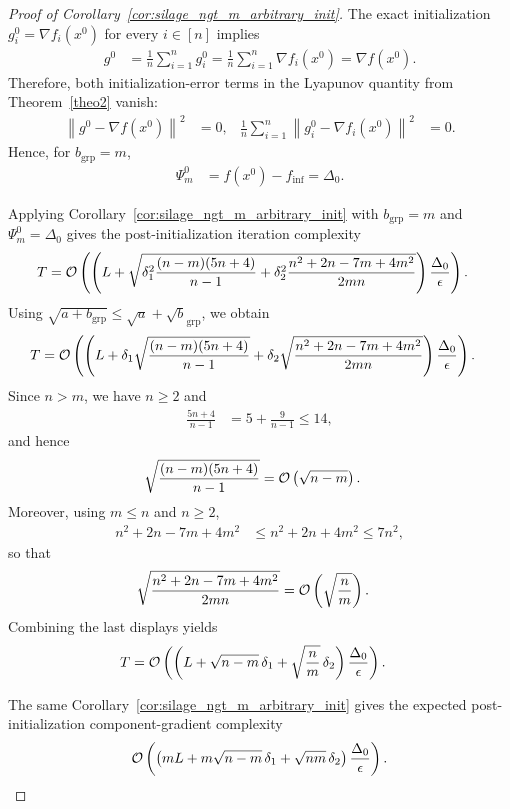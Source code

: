 \documentclass{article}
\newcommand{\sqn}[1]{\left\| #1 \right\|^2}
\newcommand{\nf}[1]{\nabla f\rb{#1}}
\newcommand{\cO}{{\cal O}}
\newcommand{\finf}{f_\mathrm{inf}}
\newcommand{\rb}[1]{\left(#1\right)}
\newcommand {\rbl}[1]{(#1)} %
\renewcommand{\nf}[1]{\nabla f\rbl{#1}}
\newcommand{\nfi}[1]{\nabla f_i\rbl{#1}}
\theoremstyle{plain}
\begin{document}
\begin{proof}[Proof of Corollary~\ref{cor:silage_ngt_m_arbitrary_init}]
The exact initialization $g_i^0=\nfi{x^0}$ for every $i\in[n]$ implies
\begin{align*}
g^0
&=
\frac1n\sum_{i=1}^n g_i^0
=
\frac1n\sum_{i=1}^n \nfi{x^0}
=
\nf{x^0}.
\end{align*}
Therefore, both initialization-error terms in the Lyapunov quantity from Theorem~\ref{theo2} vanish:
\begin{align*}
\sqn{g^0-\nf{x^0}}
&=0,
&
\frac1n\sum_{i=1}^n\sqn{g_i^0-\nfi{x^0}}
&=0.
\end{align*}
Hence, for $b_{\mathrm{grp}}=m$,
\begin{align*}
\Psi_m^0
&=
f(x^0)-\finf
=
\Delta_0.
\end{align*}

Applying Corollary~\ref{cor:silage_ngt_m_arbitrary_init} with $b_{\mathrm{grp}}=m$ and $\Psi_m^0=\Delta_0$ gives the post-initialization iteration complexity
\begin{align*}
T
&=
\cO\rb{
\rb{
L+\sqrt{
\delta_1^2\frac{(n-m)(5n+4)}{n-1}
+\delta_2^2\frac{n^2+2n-7m+4m^2}{2mn}
}
}
\frac{\Delta_0}{\epsilon}
}.
\end{align*}
Using $\sqrt{a+b_{\mathrm{grp}}}\le \sqrt a+\sqrt b_{\mathrm{grp}}$, we obtain
\begin{align*}
T
&=
\cO\rb{
\rb{
L
+\delta_1\sqrt{\frac{(n-m)(5n+4)}{n-1}}
+\delta_2\sqrt{\frac{n^2+2n-7m+4m^2}{2mn}}
}
\frac{\Delta_0}{\epsilon}
}.
\end{align*}
Since $n>m$, we have $n\ge 2$ and
\begin{align*}
\frac{5n+4}{n-1}
&=
5+\frac{9}{n-1}
\le
14,
\end{align*}
and hence
\begin{align*}
\sqrt{\frac{(n-m)(5n+4)}{n-1}}
&=
\cO\rb{\sqrt{n-m}}.
\end{align*}
Moreover, using $m\le n$ and $n\ge 2$,
\begin{align*}
n^2+2n-7m+4m^2
&\le
n^2+2n+4m^2
\le
7n^2,
\end{align*}
so that
\begin{align*}
\sqrt{\frac{n^2+2n-7m+4m^2}{2mn}}
&=
\cO\rb{\sqrt{\frac{n}{m}}}.
\end{align*}
Combining the last displays yields
\begin{align*}
T
&=
\cO\rb{
\rb{
L+\sqrt{n-m}\,\delta_1+\sqrt{\frac{n}{m}}\,\delta_2
}
\frac{\Delta_0}{\epsilon}
}.
\end{align*}

The same Corollary~\ref{cor:silage_ngt_m_arbitrary_init} gives the expected post-initialization component-gradient complexity
\begin{align*}
\cO\rb{
\rb{
mL+m\sqrt{n-m}\,\delta_1+\sqrt{nm}\,\delta_2
}
\frac{\Delta_0}{\epsilon}
}.
\end{align*}


\end{proof}
\end{document}
